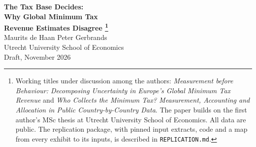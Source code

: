 \documentclass[11pt,a4paper]{article}
\begin{document}
\thispagestyle{plain}
\begin{center}
  {\LARGE\bfseries The Tax Base Decides:\\[0.2em] Why Global Minimum Tax\\[0.1em] Revenue Estimates Disagree%
  \footnote{Working titles under discussion among the authors: \emph{Measurement before Behaviour: Decomposing Uncertainty in Europe's Global Minimum Tax Revenue} and \emph{Who Collects the Minimum Tax? Measurement, Accounting and Allocation in Public Country-by-Country Data}. The paper builds on the first author's MSc thesis at Utrecht University School of Economics. All data are public. The replication package, with pinned input extracts, code and a map from every exhibit to its inputs, is described in \texttt{REPLICATION.md}.}}\\[1.2em]
  {\large Maurits de Haan \qquad Peter Gerbrands}\\[0.3em]
  {\small Utrecht University School of Economics}\\[0.3em]
  {\small Draft, November 2026}
\end{center}

\begin{abstract}
\noindent European governments have budgeted revenue from the Global Minimum Tax, yet published estimates for the same country differ by multiples. We trace that disagreement to its sources. Using public OECD country-by-country data for 2017–2023, we compute European revenue under every combination of six modelling decisions and attribute the variance across estimates to each decision. Two decisions dominate: how profit taxed below 15\% is measured and how accounting profit is translated into the minimum-tax base. Together they explain 85.3–91.5\% of the variance. Statistical uncertainty in estimated parameters accounts for less than 1.3\%, and profit-shifting responses shrink once a division bias in effective tax rates is removed. The accounting adjustments bring the preferred distributional specification closer to several national budget forecasts. Under the 2026 Side-by-Side package, repealing a domestic top-up tax becomes a tax cut for US-parented groups: 85.9\% of Ireland’s net forgone receipts corresponds to lower modelled liability for firms.

\medskip
\noindent\textbf{JEL codes:} H25, H87, F23, C54\\
\textbf{Keywords:} global minimum tax; Pillar Two; country-by-country reporting; revenue estimation; profit shifting; tax competition
\end{abstract}
\end{document}

